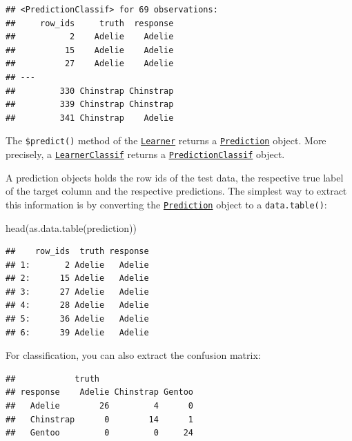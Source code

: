 \documentclass[
]{scrbook}
\newenvironment{Shaded}{\begin{snugshade}}{\end{snugshade}}
\newcommand{\FunctionTok}[1]{\textcolor[rgb]{0.00,0.00,0.00}{#1}}
\newcommand{\NormalTok}[1]{#1}
\newcommand{\SpecialCharTok}[1]{\textcolor[rgb]{0.00,0.00,0.00}{#1}}
\renewenvironment{Shaded} {\begin{snugshade}\small} {\end{snugshade}}
\begin{document}
\begin{verbatim}
## <PredictionClassif> for 69 observations:
##     row_ids     truth  response
##           2    Adelie    Adelie
##          15    Adelie    Adelie
##          27    Adelie    Adelie
## ---                            
##         330 Chinstrap Chinstrap
##         339 Chinstrap Chinstrap
##         341 Chinstrap    Adelie
\end{verbatim}

The \texttt{\$predict()} method of the \href{https://mlr3.mlr-org.com/reference/Learner.html}{\texttt{Learner}} returns a \href{https://mlr3.mlr-org.com/reference/Prediction.html}{\texttt{Prediction}} object.
More precisely, a \href{https://mlr3.mlr-org.com/reference/LearnerClassif.html}{\texttt{LearnerClassif}} returns a \href{https://mlr3.mlr-org.com/reference/PredictionClassif.html}{\texttt{PredictionClassif}} object.

A prediction objects holds the row ids of the test data, the respective true label of the target column and the respective predictions.
The simplest way to extract this information is by converting the \href{https://mlr3.mlr-org.com/reference/Prediction.html}{\texttt{Prediction}} object to a \texttt{data.table()}:

\begin{Shaded}
\begin{Highlighting}[]
\FunctionTok{head}\NormalTok{(}\FunctionTok{as.data.table}\NormalTok{(prediction))}
\end{Highlighting}
\end{Shaded}

\begin{verbatim}
##    row_ids  truth response
## 1:       2 Adelie   Adelie
## 2:      15 Adelie   Adelie
## 3:      27 Adelie   Adelie
## 4:      28 Adelie   Adelie
## 5:      36 Adelie   Adelie
## 6:      39 Adelie   Adelie
\end{verbatim}

For classification, you can also extract the confusion matrix:

\begin{Shaded}
\end{Shaded}

\begin{verbatim}
##            truth
## response    Adelie Chinstrap Gentoo
##   Adelie        26         4      0
##   Chinstrap      0        14      1
##   Gentoo         0         0     24
\end{verbatim}
\end{document}
